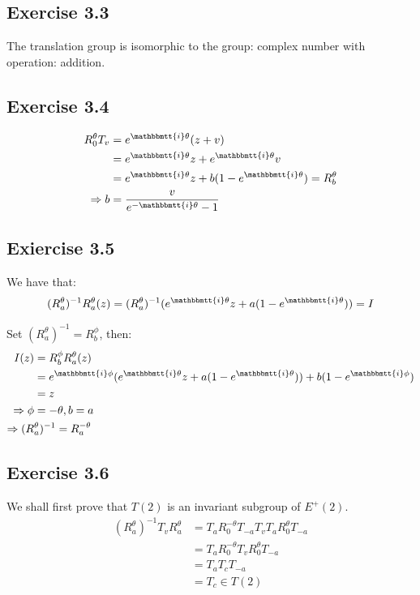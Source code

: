 \documentclass[]{ctexart}
\newcommand{\mi}{\mathbbmtt{i}}
\begin{document}
	\subsection{Exercise 3.3}
		The translation group is isomorphic to the group: complex number with operation: addition.
		
	\subsection{Exercise 3.4}
		\begin{equation*}
		\begin{aligned}
			R_0^{\theta}T_v&=e^{\mi \theta}(z+v)\\
			               &=e^{\mi \theta}z+e^{\mi \theta}v\\
			               &=e^{\mi \theta}z+b(1-e^{\mi \theta })=R_b^{\theta}\\
			\Rightarrow   b&=\frac{v}{e^{-\mi \theta}-1}
		\end{aligned}
		\end{equation*}
		
	\subsection{Exiercise 3.5}
		We have that: 
			\begin{equation*}
			\begin{aligned}
				(R_a^{\theta})^{-1}R_a^{\theta}(z)=(R_a^{\theta})^{-1}(e^{\mi \theta}z+a(1-e^{\mi \theta}))=I
			\end{aligned}
			\end{equation*}
		
		Set $(R_a^{\theta})^{-1}=R_b^{\phi}$, then:
			\begin{equation*}
			\begin{aligned}
				I(z)&=R_b^{\phi}R_a^{\theta}(z)\\
				&=e^{\mi \phi}(e^{\mi \theta}z+a(1-e^{\mi \theta}))+b(1-e^{\mi \phi})\\
				&=z\\
				\Rightarrow \phi &=-\theta, b=a\\
				\Rightarrow (R&_a^{\theta})^{-1}=R_a^{-\theta}
			\end{aligned}
			\end{equation*}
			
	\subsection{Exercise 3.6}
		We shall first prove that $T(2)$ is an invariant subgroup of $E^+(2)$. 
			\begin{equation*}
			\begin{aligned}
				(R_a^{\theta})^{-1}T_vR_a^{\theta}&=T_aR_0^{-\theta}T_{-a}T_vT_aR_0^{\theta}T_{-a}\\
				&=T_aR_0^{-\theta}T_vR_0^{\theta}T_{-a}\\
				&=T_aT_cT_{-a}\\
				&=T_c\in T(2)
			\end{aligned}
			\end{equation*}
		
\end{document}
